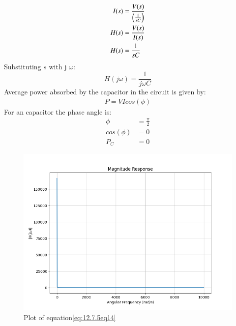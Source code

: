 \documentclass[journal,12pt,onecolumn]{IEEEtran}
\theoremstyle{remark}
\begin{document}
\begin{align}
    I(s) &= \dfrac{V(s)}{\left(\frac{1}{sC}\right)}\label{eq:12.7.5eq11}\\ 
    H(s) &= \dfrac{V(s)}{I(s)}\label{eq:12.7.5eq12}\\
	H(s) &= \frac{1}{sC}\label{eq:12.7.5eq13}
\end{align}
Substituting $s$ with j $\omega$:
\begin{equation}
	H(j\omega) = \frac{1}{j\omega C }\label{eq:12.7.5eq14}
\end{equation}
Average power absorbed by the capacitor in the circuit is given by:
\begin{align}
	P=VIcos(\phi) \label{eq:12.7.5eq15}
\end{align}
For an capacitor the phase angle is:
\begin{align}
	\phi &= \frac{\pi}{2}\label{eq:12.7.5eq16}\\
	cos(\phi) &= 0\label{eq:12.7.5eq17}\\
	P_C &= 0\label{eq:12.7.5eq18}
\end{align}
\begin{figure}[h!]
  \centering
  \includegraphics[width=\columnwidth]{figs/plot2.png}
  \caption{Plot of equation\eqref{eq:12.7.5eq14}}
  \label{}
\end{figure}	
\end{document}
